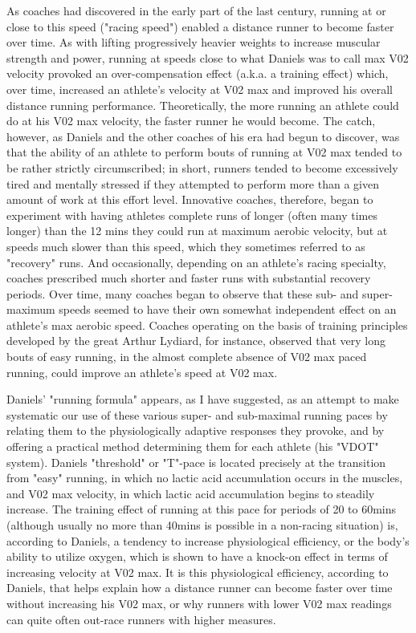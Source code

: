 As coaches had discovered in the early part of the last century, running at or close to this speed ("racing speed") enabled a distance runner to become faster over time. As with lifting progressively heavier weights to increase muscular strength and power, running at speeds close to what Daniels was to call max V02 velocity provoked an over-compensation effect (a.k.a. a training effect) which, over time, increased an athlete's velocity at V02 max and improved his overall distance running performance. Theoretically, the more running an athlete could do at his V02 max velocity, the faster runner he would become. The catch, however, as Daniels and the other coaches of his era had begun to discover, was that the ability of an athlete to perform bouts of running at V02 max tended to be rather strictly circumscribed; in short, runners tended to become excessively tired and mentally stressed if they attempted to perform more than a given amount of work at this effort level. Innovative coaches, therefore, began to experiment with having athletes complete runs of longer (often many times longer) than the 12 mins they could run at maximum aerobic velocity, but at speeds much slower than this speed, which they sometimes referred to as "recovery" runs. And occasionally, depending on an athlete's racing specialty, coaches prescribed much shorter and faster runs with substantial recovery periods. Over time, many coaches began to observe that these sub- and super- maximum speeds seemed to have their own somewhat independent effect on an athlete's max aerobic speed. Coaches operating on the basis of training principles developed by the great Arthur Lydiard, for instance, observed that very long bouts of easy running, in the almost complete absence of V02 max paced running, could improve an athlete's speed at V02 max.

Daniels' "running formula" appears, as I have suggested, as an attempt to make systematic our use of these various super- and sub-maximal running paces by relating them to the physiologically adaptive responses they provoke, and by offering a practical method determining them for each athlete (his "VDOT" system). Daniels "threshold" or "T"-pace is located precisely at the transition from "easy" running, in which no lactic acid accumulation occurs in the muscles, and V02 max velocity, in which lactic acid accumulation begins to steadily increase. The training effect of running at this pace for periods of 20 to 60mins (although usually no more than 40mins is possible in a non-racing situation) is, according to Daniels, a tendency to increase physiological efficiency, or the body's ability to utilize oxygen, which is shown to have a knock-on effect in terms of increasing velocity at V02 max. It is this physiological efficiency, according to Daniels, that helps explain how a distance runner can become faster over time without increasing his V02 max, or why runners with lower V02 max readings can quite often out-race runners with higher measures.

